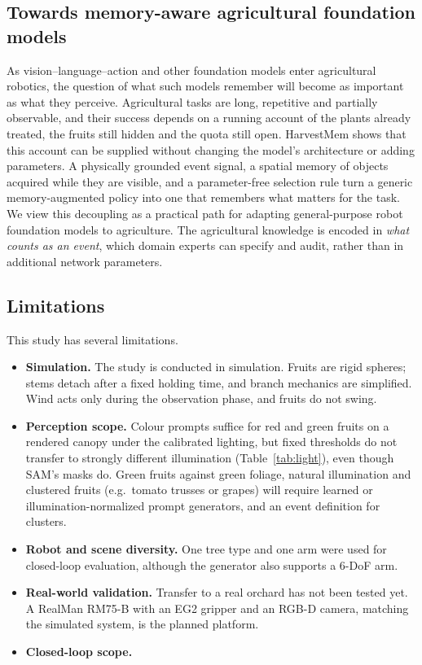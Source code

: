 \subsection{Towards memory-aware agricultural foundation models}
As vision--language--action and other foundation models enter agricultural robotics, the question of what such models remember will become as important as what they perceive. Agricultural tasks are long, repetitive and partially observable, and their success depends on a running account of the plants already treated, the fruits still hidden and the quota still open. HarvestMem shows that this account can be supplied without changing the model's architecture or adding parameters. A physically grounded event signal, a spatial memory of objects acquired while they are visible, and a parameter-free selection rule turn a generic memory-augmented policy into one that remembers what matters for the task. We view this decoupling as a practical path for adapting general-purpose robot foundation models to agriculture. The agricultural knowledge is encoded in \emph{what counts as an event}, which domain experts can specify and audit, rather than in additional network parameters.

\subsection{Limitations}
This study has several limitations.
\begin{itemize}
\item \textbf{Simulation.} The study is conducted in simulation. Fruits are rigid spheres; stems detach after a fixed holding time, and branch mechanics are simplified. Wind acts only during the observation phase, and fruits do not swing.
\item \textbf{Perception scope.} Colour prompts suffice for red and green fruits on a rendered canopy under the calibrated lighting, but fixed thresholds do not transfer to strongly different illumination (Table~\ref{tab:light}), even though SAM's masks do. Green fruits against green foliage, natural illumination and clustered fruits (e.g.\ tomato trusses or grapes) will require learned or illumination-normalized prompt generators, and an event definition for clusters.
\item \textbf{Robot and scene diversity.} One tree type and one arm were used for closed-loop evaluation, although the generator also supports a 6-DoF arm.
\item \textbf{Real-world validation.} Transfer to a real orchard has not been tested yet. A RealMan RM75-B with an EG2 gripper and an RGB-D camera, matching the simulated system, is the planned platform.
\item \textbf{Closed-loop scope.} 
\end{itemize}

